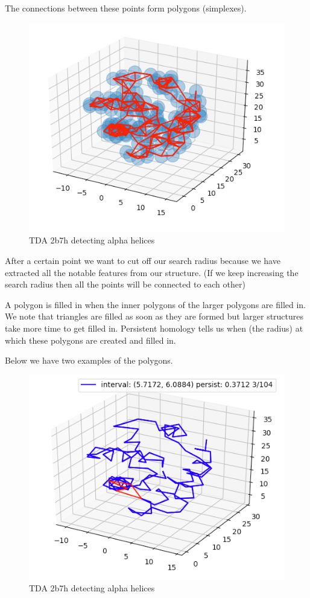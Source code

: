\documentclass[12pt, a4paper, twocolumn, fullpage]{article}
\theoremstyle{plain}
\theoremstyle{definition}
\theoremstyle{remark}
\begin{document}
The connections between these points form polygons (simplexes).
\begin{figure}[t]
	\includegraphics[width=\linewidth]{img/hom/ballRad3.png}
	\caption{TDA 2b7h detecting alpha helices }
	\label{fig:tdahelix}
\end{figure}
After a certain point we want to cut off our search radius because we have extracted all the notable features from our structure.
(If we keep increasing the search radius then all the points will be connected to each other)

A polygon is filled in when the inner polygons of the larger polygons are filled in.
We note that triangles are filled as soon as they are formed but larger structures take more time to get filled in.
Persistent homology tells us when (the radius) at which these polygons are created and filled in.


Below we have two examples of the polygons.
\begin{figure}[t]
	\includegraphics[width=\linewidth]{img/hom/Simplex1.png}
	\caption{TDA 2b7h detecting alpha helices }
	\label{fig:tdahelix}
\end{figure}
\end{document}
